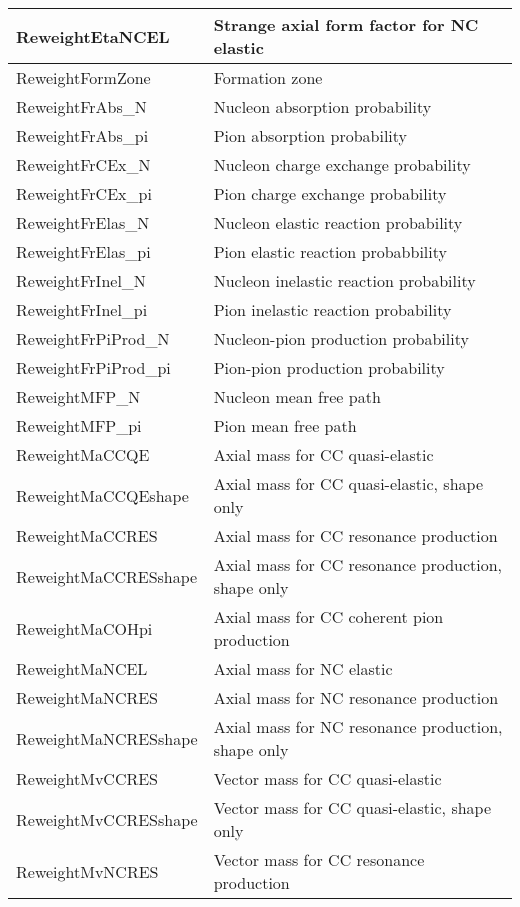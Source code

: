 \begin{longtable}{|p{}|p{}|}
 ReweightEtaNCEL & Strange axial form factor for NC elastic  \\ \hline
 ReweightFormZone & Formation zone \\ \hline
 ReweightFrAbs\_N & Nucleon absorption probability \\ \hline
 ReweightFrAbs\_pi &Pion absorption probability \\ \hline
 ReweightFrCEx\_N & Nucleon charge exchange probability \\ \hline
 ReweightFrCEx\_pi & Pion charge exchange probability \\ \hline
 ReweightFrElas\_N & Nucleon elastic reaction probability \\ \hline
 ReweightFrElas\_pi & Pion elastic reaction probabbility \\ \hline
 ReweightFrInel\_N & Nucleon inelastic reaction probability \\ \hline
 ReweightFrInel\_pi &Pion inelastic reaction probability \\ \hline
 ReweightFrPiProd\_N &Nucleon-pion production probability  \\ \hline
 ReweightFrPiProd\_pi &Pion-pion production probability \\ \hline
 ReweightMFP\_N & Nucleon mean free path \\ \hline
 ReweightMFP\_pi & Pion mean free path \\ \hline
 ReweightMaCCQE & Axial mass for CC quasi-elastic \\ \hline
 ReweightMaCCQEshape & Axial mass for CC quasi-elastic, shape only \\ \hline
 ReweightMaCCRES & Axial mass for CC resonance production \\ \hline
 ReweightMaCCRESshape & Axial mass for CC resonance production, shape only \\ \hline
 ReweightMaCOHpi & Axial mass for CC coherent pion production \\ \hline
 ReweightMaNCEL & Axial mass for NC elastic \\ \hline
 ReweightMaNCRES & Axial mass for NC resonance production \\ \hline
 ReweightMaNCRESshape & Axial mass for NC resonance production, shape only \\ \hline
 ReweightMvCCRES & Vector mass for CC quasi-elastic \\ \hline
 ReweightMvCCRESshape & Vector mass for CC quasi-elastic, shape only \\ \hline
 ReweightMvNCRES & Vector mass for CC resonance production \\ \hline

\end{longtable}
